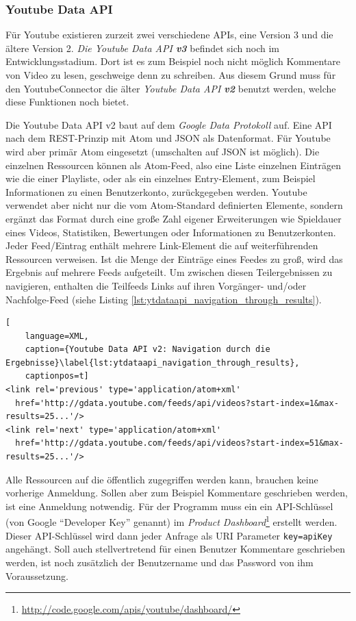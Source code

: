 \subsubsection{Youtube Data API} %
\label{ssub:youtube_data_api}

Für Youtube existieren zurzeit zwei verschiedene APIs, eine Version 3 und die ältere Version 2. \emph{Die Youtube Data API \textbf{v3}} befindet sich noch im Entwicklungsstadium. Dort ist es zum Beispiel noch nicht möglich Kommentare von Video zu lesen, geschweige denn zu schreiben. Aus diesem Grund muss für den YoutubeConnector die älter \emph{Youtube Data API \textbf{v2}} benutzt werden, welche diese Funktionen noch bietet. 

Die Youtube Data API v2 baut auf dem \emph{Google Data Protokoll} auf. Eine API nach dem REST-Prinzip mit Atom und JSON als Datenformat. Für Youtube wird aber primär Atom eingesetzt (umschalten auf JSON ist möglich). Die einzelnen Ressourcen können als Atom-Feed, also eine Liste einzelnen Einträgen wie die einer Playliste, oder als ein einzelnes Entry-Element, zum Beispiel Informationen zu einen Benutzerkonto, zurückgegeben werden. Youtube verwendet aber nicht nur die vom Atom-Standard definierten Elemente, sondern ergänzt das Format durch eine große Zahl eigener Erweiterungen wie Spieldauer eines Videos, Statistiken, Bewertungen oder Informationen zu Benutzerkonten. Jeder Feed/Eintrag enthält mehrere Link-Element die auf weiterführenden Ressourcen verweisen. Ist die Menge der Einträge eines Feedes zu groß, wird das Ergebnis auf mehrere Feeds aufgeteilt. Um zwischen diesen Teilergebnissen zu navigieren, enthalten die Teilfeeds Links auf ihren Vorgänger- und/oder Nachfolge-Feed (siehe Listing \ref{lst:ytdataapi_navigation_through_results}).

\begin{lstlisting}[
    language=XML,
    caption={Youtube Data API v2: Navigation durch die Ergebnisse}\label{lst:ytdataapi_navigation_through_results},
    captionpos=t]
<link rel='previous' type='application/atom+xml'
  href='http://gdata.youtube.com/feeds/api/videos?start-index=1&max-results=25...'/>
<link rel='next' type='application/atom+xml'
  href='http://gdata.youtube.com/feeds/api/videos?start-index=51&max-results=25...'/>
\end{lstlisting}

Alle Ressourcen auf die öffentlich zugegriffen werden kann, brauchen keine vorherige Anmeldung. Sollen aber zum Beispiel Kommentare geschrieben werden, ist eine Anmeldung notwendig. Für der Programm muss ein ein API-Schlüssel (von Google \enquote{Developer Key} genannt) im \emph{Product Dashboard}\footnote{\url{http://code.google.com/apis/youtube/dashboard/}} erstellt werden. Dieser API-Schlüssel wird dann jeder Anfrage als URI Parameter \texttt{key={apiKey}} angehängt. Soll auch stellvertretend für einen Benutzer Kommentare geschrieben werden, ist noch zusätzlich der Benutzername und das Password von ihm Voraussetzung.

